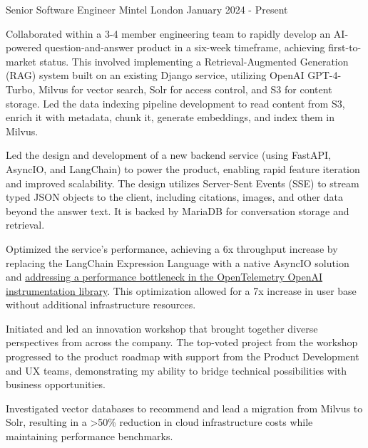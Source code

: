 \documentclass[11pt, a4paper]{awesome-cv}
\begin{document}


\begin{cventries}

  \cventry
    {Senior Software Engineer}
    {Mintel}
    {London}
    {January 2024 - Present}
    {
      \begin{cvitems}
        \item {Collaborated within a 3-4 member engineering team to rapidly develop an AI-powered question-and-answer product in a six-week timeframe, achieving first-to-market status. This involved implementing a Retrieval-Augmented Generation (RAG) system built on an existing Django service, utilizing OpenAI GPT-4-Turbo, Milvus for vector search, Solr for access control, and S3 for content storage. Led the data indexing pipeline development to read content from S3, enrich it with metadata, chunk it, generate embeddings, and index them in Milvus.}
        \item {Led the design and development of a new backend service (using FastAPI, AsyncIO, and LangChain) to power the product, enabling rapid feature iteration and improved scalability. The design utilizes Server-Sent Events (SSE) to stream typed JSON objects to the client, including citations, images, and other data beyond the answer text. It is backed by MariaDB for conversation storage and retrieval.}
        \item {Optimized the service's performance, achieving a 6x throughput increase by replacing the LangChain Expression Language with a native AsyncIO solution and \href{https://leverstone.me/blog/performance-profiling-in-python-tools-techniques-and-an-unexpected-culprit}{addressing a performance bottleneck in the OpenTelemetry OpenAI instrumentation library}. This optimization allowed for a 7x increase in user base without additional infrastructure resources.}
        \item {Initiated and led an innovation workshop that brought together diverse perspectives from across the company. The top-voted project from the workshop progressed to the product roadmap with support from the Product Development and UX teams, demonstrating my ability to bridge technical possibilities with business opportunities.}
        \item {Investigated vector databases to recommend and lead a migration from Milvus to Solr, resulting in a >50\% reduction in cloud infrastructure costs while maintaining performance benchmarks.}

\end{cvitems}}
\end{cventries}
\end{document}

